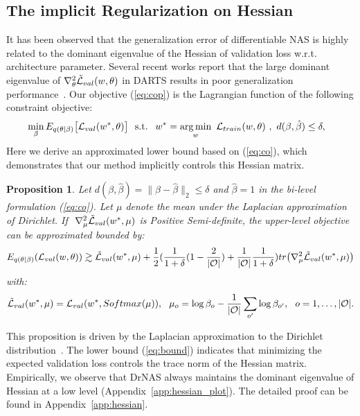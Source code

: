 \documentclass{article} \usepackage{iclr2021_conference,times}
\DeclareMathOperator*{\argmin}{arg\,min}
\newtheorem{prop}{Proposition}
\begin{document}
\subsection{The implicit Regularization on Hessian}
\label{subsec:hessian}
It has been observed that the generalization error of differentiable NAS is highly related to the dominant eigenvalue of the Hessian of validation loss w.r.t. architecture parameter.
Several recent works report that the large dominant eigenvalue of $\nabla_\theta^2 \Tilde{\mathcal{L}}_{val}(w, \theta)$ in DARTS results in poor generalization performance~\citep{understanding,smoothdarts}.
Our objective (\ref{eq:cop}) is the Lagrangian function of the following constraint objective:
\begin{align}
    &\min_{\beta} E_{q(\theta|\beta)} \big{[}\mathcal{L}_{val} (w^*, \theta)\big{]}\
    \text{ s.t. }\ w^* = \argmin_w\ \mathcal{L}_{train}(w,\theta)\ ,\ d(\beta, \hat\beta) \leq \delta, 
\label{eq:co}
\end{align}
Here we derive an approximated lower bound based on (\ref{eq:co}), which demonstrates that our method implicitly controls this Hessian matrix.
\begin{prop}
    \label{prop:hessian}
    Let $d(\beta, \hat\beta) = \|\beta - \hat\beta\|_2 \leq \delta$ and $\hat\beta = 1$ in the bi-level formulation (\ref{eq:co}).
    Let $\mu$ denote the mean under the Laplacian approximation of Dirichlet.
    If $\ \nabla_{\mu}^2\Tilde{\mathcal{L}}_{val} (w^*, \mu)$ is Positive Semi-definite, 
    the upper-level objective can be approximated bounded by:
    \begin{align}
    	\label{eq:bound}
        E_{q(\theta|\beta)}(\mathcal{L}_{val}(w, \theta)) \gtrsim \Tilde{\mathcal{L}}_{val} (w^*, \mu) + \frac{1}{2} (\frac{1}{1 + \delta}(1 - \frac{2}{|\mathcal{O}|}) + \frac{1}{|\mathcal{O}|}\frac{1}{1 + \delta}) tr\big{(} \nabla_{\mu}^2 \Tilde{\mathcal{L}}_{val} (w^*, \mu) \big{)}
    \end{align}
    with:
    \begin{align*}
        \Tilde{\mathcal{L}}_{val} (w^*, \mu) = \mathcal{L}_{val} (w^*, Softmax(\mu)),\ \
        \mu_o = \log{\beta_o} - \frac{1}{|\mathcal{O}|} \sum_{o'} \log{\beta_{o'}},\ \ o=1,\dots ,|\mathcal{O}|.
    \end{align*}
\end{prop}
This proposition is driven by the Laplacian approximation to the Dirichlet distribution~\citep{laplace,topic}.
The lower bound (\ref{eq:bound}) indicates that minimizing the expected validation loss controls the trace norm of the Hessian matrix.
Empirically, we observe that DrNAS always maintains the dominant eigenvalue of Hessian at a low level (Appendix~\ref{app:hessian_plot}).
The detailed proof can be found in Appendix~\ref{app:hessian}.
\end{document}
